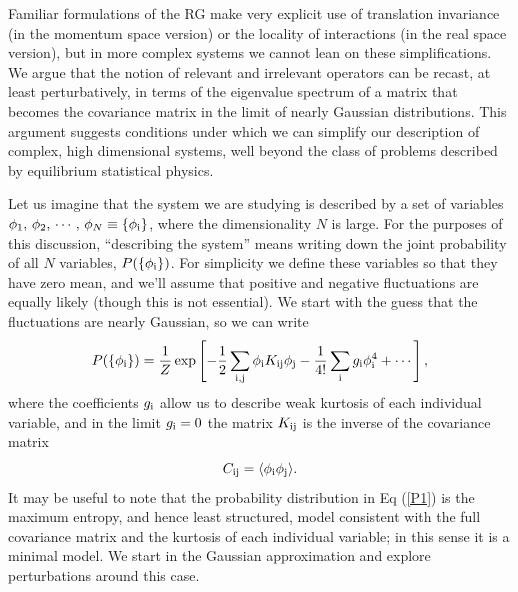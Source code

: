 \documentclass[aps,twocolumn,floats,nofootinbib,prl]{revtex4}
\begin{document}
Familiar formulations of the RG make very explicit use of translation invariance (in the momentum space version) or the locality of interactions (in the real space version), but in more complex systems we cannot lean on these  simplifications.  We argue that the notion of relevant and irrelevant operators can be recast, at least perturbatively, in terms of the eigenvalue spectrum of a matrix that becomes the covariance matrix in the limit of nearly Gaussian distributions.  This argument suggests conditions under which we can simplify our description of complex, high dimensional systems, well beyond the class of problems described by equilibrium statistical physics.

Let us imagine that the system we are studying is described by a set of variables $\phi_1, \, \phi_2, \, \cdots ,\, \phi_N \equiv \{\phi_{\rm i}\}$, where the dimensionality $N$ is large.  For the purposes of this discussion, ``describing the system'' means  writing down the joint probability of all $N$ variables, $P(\{\phi_{\rm i}\})$.  For simplicity we define these variables so that they have zero mean, and we'll assume that positive and negative fluctuations are equally likely (though this is not essential).    We start with the guess that the fluctuations are nearly Gaussian, so we can write
\begin{equation}
P(\{\phi_{\rm i}\}) = \frac{1}{Z}\exp\left[ - \frac{1}{2}\sum_{{\rm i},{\rm j}} \phi_{\rm i} K_{\rm ij} \phi_{\rm j} - \frac{1}{4!}\sum_{\rm i} g_{\rm i} \phi_{\rm i}^4 + \cdots \right] ,
\label{P1}
\end{equation}
where the coefficients $g_{\rm i}$ allow us to describe weak kurtosis of each individual variable, and in the limit $g_{\rm i} = 0$ the matrix $K_{\rm ij}$ is the inverse of the covariance matrix
\begin{equation}
C_{\rm ij} = \langle \phi_{\rm i}\phi_{\rm j}\rangle .
\end{equation}
It may be useful to note that the probability distribution in Eq (\ref{P1}) is the maximum entropy, and hence least structured,  model consistent with the full covariance matrix and the kurtosis  of each individual variable; in this sense it is a minimal model. We start  in the Gaussian approximation and explore perturbations around this case.  
\end{document}
